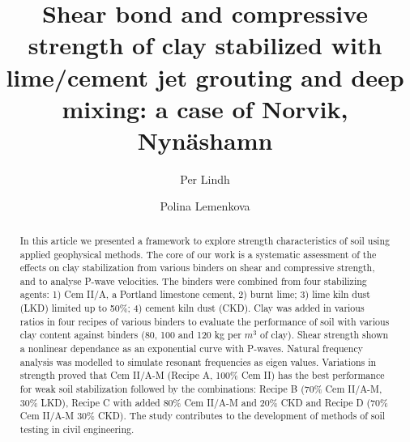 \documentclass[USenglish,twocolumn]{article}
\begin{document}
 
\author[1]{Per Lindh}
\author*[2]{Polina Lemenkova}

  \title{\huge Shear bond and compressive strength of clay stabilized with lime/cement jet grouting and deep mixing: a case of Norvik, Nynäshamn}
  

\begin{abstract}
{In this article we presented a framework to explore strength characteristics of soil using applied geophysical methods. The core of our work is a systematic assessment of the effects on clay stabilization from various binders on shear and compressive strength, and to analyse P-wave velocities. The binders were combined from four stabilizing agents: 1) Cem II/A, a Portland limestone cement, 2) burnt lime; 3) lime kiln dust (LKD) limited up to 50\%; 4) cement kiln dust (CKD). Clay was added in various ratios in four recipes of various binders to evaluate the performance of soil with various clay content against binders (80, 100 and 120 kg per $m^3$ of clay). Shear strength  shown a nonlinear dependance as an exponential curve with P-waves. Natural frequency analysis was modelled to simulate resonant frequencies as eigen values. Variations in strength proved that Cem II/A-M (Recipe A, 100\% Cem II) has the best performance for weak soil stabilization followed by the combinations: Recipe B (70\% Cem II/A-M, 30\% LKD), Recipe C with added 80\% Cem II/A-M and 20\% CKD and Recipe D (70\% Cem II/A-M 30\% CKD). The study contributes to the development of methods of soil testing in civil engineering.}
\end{abstract}
 
\end{document}
